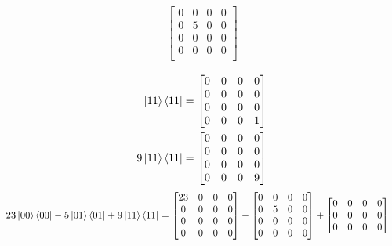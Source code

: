 \documentclass[11pt]{article}
\begin{document}
\begin{enumerate}
\begin{align*}
\begin{bmatrix}
            0 & 0 & 0 & 0 \\
            0 & 5 & 0 & 0 \\
            0 & 0 & 0 & 0 \\
            0 & 0 & 0 & 0 \\
        \end{bmatrix} \\
    \end{align*}
    \begin{align*}
        \ket{11}\bra{11} &= 
        \begin{bmatrix}
            0 & 0 & 0 & 0 \\
            0 & 0 & 0 & 0 \\
            0 & 0 & 0 & 0 \\
            0 & 0 & 0 & 1 \\
        \end{bmatrix} \\
        9\ket{11}\bra{11} &= \begin{bmatrix}
            0 & 0 & 0 & 0 \\
            0 & 0 & 0 & 0 \\
            0 & 0 & 0 & 0 \\
            0 & 0 & 0 & 9 \\
        \end{bmatrix}
    \end{align*}
    \begin{align*}
        23\ket{00}\bra{00} - 5\ket{01}\bra{01} + 9\ket{11}\bra{11}
        &= \begin{bmatrix}
            23 & 0 & 0 & 0 \\
            0 & 0 & 0 & 0 \\
            0 & 0 & 0 & 0 \\
            0 & 0 & 0 & 0 \\
        \end{bmatrix} - \begin{bmatrix}
            0 & 0 & 0 & 0 \\
            0 & 5 & 0 & 0 \\
            0 & 0 & 0 & 0 \\
            0 & 0 & 0 & 0 \\
        \end{bmatrix}  + 
        \begin{bmatrix}
            0 & 0 & 0 & 0 \\
            0 & 0 & 0 & 0 \\
            0 & 0 & 0 & 0 \\

\end{bmatrix}
\end{align*}
\end{enumerate}
\end{document}
